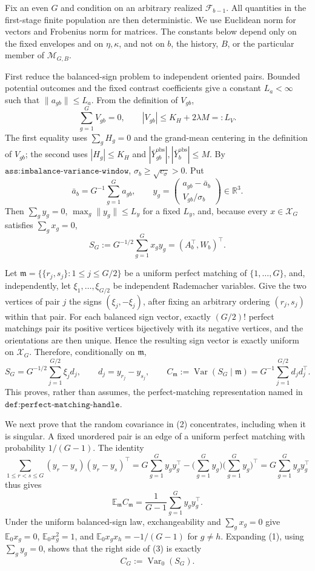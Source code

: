 Fix an even \(G\) and condition on an arbitrary realized \(\mathcal F_{b-1}\).  All quantities in the first-stage finite population are then deterministic.  We use Euclidean norm for vectors and Frobenius norm for matrices.  The constants below depend only on the fixed envelopes and on \(\eta,\kappa\), and not on \(b\), the history, \(B\), or the particular member of \(\mathcal M_{G,B}\).

First reduce the balanced-sign problem to independent oriented pairs.  Bounded potential outcomes and the fixed contrast coefficients give a constant \(L_a<\infty\) such that \(\|a_{gb}\|\leq L_a\).  From the definition of \(V_{gb}\),
\[
 \sum_{g=1}^G V_{gb}=0,
 \qquad
 |V_{gb}|\leq K_H+2\lambda M=:L_V.
\]
The first equality uses \(\sum_gH_g=0\) and the grand-mean centering in the definition of \(V_{gb}\); the second uses \(|H_g|\leq K_H\) and \(|\bar Y^{\mathrm{obs}}_{gb}|,|\bar Y^{\mathrm{obs}}_b|\leq M\).  By \(\texttt{ass:imbalance-variance-window}\), \(\sigma_b\geq\sqrt{c_\sigma}>0\).  Put
\[
 \bar a_b=G^{-1}\sum_{g=1}^Ga_{gb},
 \qquad
 y_g=\begin{pmatrix}a_{gb}-\bar a_b\\ V_{gb}/\sigma_b\end{pmatrix}\in\mathbb R^3.
\]
Then \(\sum_gy_g=0\), \(\max_g\|y_g\|\leq L_y\) for a fixed \(L_y\), and, because every \(x\in\mathcal X_G\) satisfies \(\sum_gx_g=0\),
\[
 S_G:=G^{-1/2}\sum_{g=1}^Gx_gy_g=(A_b^\top,W_b)^\top. \tag{1}
\]

Let \(\mathfrak m=\{\{r_j,s_j\}:1\leq j\leq G/2\}\) be a uniform perfect matching of \(\{1,\ldots,G\}\), and, independently, let \(\xi_1,\ldots,\xi_{G/2}\) be independent Rademacher variables.  Give the two vertices of pair \(j\) the signs \((\xi_j,-\xi_j)\), after fixing an arbitrary ordering \((r_j,s_j)\) within that pair.  For each balanced sign vector, exactly \((G/2)!\) perfect matchings pair its positive vertices bijectively with its negative vertices, and the orientations are then unique.  Hence the resulting sign vector is exactly uniform on \(\mathcal X_G\).  Therefore, conditionally on \(\mathfrak m\),
\[
 S_G=G^{-1/2}\sum_{j=1}^{G/2}\xi_jd_j,
 \qquad d_j=y_{r_j}-y_{s_j},
 \qquad C_{\mathfrak m}:=\operatorname{Var}(S_G\mid\mathfrak m)
       =G^{-1}\sum_{j=1}^{G/2}d_jd_j^\top.                 \tag{2}
\]
This proves, rather than assumes, the perfect-matching representation named in \(\texttt{def:perfect-matching-handle}\).

We next prove that the random covariance in (2) concentrates, including when it is singular.  A fixed unordered pair is an edge of a uniform perfect matching with probability \(1/(G-1)\).  The identity
\[
 \sum_{1\leq r<s\leq G}(y_r-y_s)(y_r-y_s)^\top
 =G\sum_{g=1}^Gy_gy_g^\top-\Big(\sum_{g=1}^Gy_g\Big)
       \Big(\sum_{g=1}^Gy_g\Big)^\top
 =G\sum_{g=1}^Gy_gy_g^\top
\]
thus gives
\[
 \mathbb E_{\mathfrak m}C_{\mathfrak m}
 =\frac1{G-1}\sum_{g=1}^Gy_gy_g^\top.                     \tag{3}
\]
Under the uniform balanced-sign law, exchangeability and \(\sum_gx_g=0\) give \(\mathbb E_0x_g=0\), \(\mathbb E_0x_g^2=1\), and \(\mathbb E_0x_gx_h=-1/(G-1)\) for \(g\ne h\).  Expanding (1), using \(\sum_gy_g=0\), shows that the right side of (3) is exactly
\[
 C_G:=\operatorname{Var}_0(S_G).                            \tag{4}
\]

